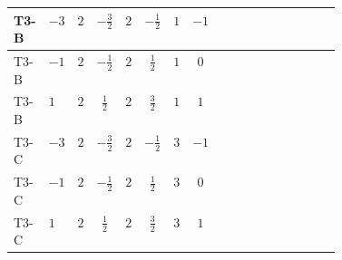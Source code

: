\documentclass[8pt]{article}
\begin{document}
\begin{landscape}
\begin{longtable}{@{}llcccccc >{\raggedright\arraybackslash}p{0.21\linewidth} >{\raggedright\arraybackslash}p{0.21\linewidth}@{}}
\midrule
T3-B & $-3$ & $2$ & $-\frac{3}{2}$ & $2$ & $-\frac{1}{2}$ & $1$ & $-1$ & \scriptsize\adjustbox{max width=\linewidth}{$\begin{gathered} 6 C_{5} Y_d Y_d^\dagger\end{gathered}$} & \scriptsize\adjustbox{max width=\linewidth}{$\begin{gathered} 6 C_{5} Y_u Y_u^\dagger\end{gathered}$} \\
\midrule
T3-B & $-1$ & $2$ & $-\frac{1}{2}$ & $2$ & $\frac{1}{2}$ & $1$ & $0$ & \scriptsize\adjustbox{max width=\linewidth}{$\begin{gathered} 6 C_{5} Y_d Y_d^\dagger\end{gathered}$} & \scriptsize\adjustbox{max width=\linewidth}{$\begin{gathered} 6 C_{5} Y_u Y_u^\dagger\end{gathered}$} \\
\midrule
T3-B & $1$ & $2$ & $\frac{1}{2}$ & $2$ & $\frac{3}{2}$ & $1$ & $1$ & \scriptsize\adjustbox{max width=\linewidth}{$\begin{gathered} 6 C_{5} Y_d Y_d^\dagger\end{gathered}$} & \scriptsize\adjustbox{max width=\linewidth}{$\begin{gathered} 6 C_{5} Y_u Y_u^\dagger\end{gathered}$} \\
\midrule
T3-C & $-3$ & $2$ & $-\frac{3}{2}$ & $2$ & $-\frac{1}{2}$ & $3$ & $-1$ & \scriptsize\adjustbox{max width=\linewidth}{$\begin{gathered} 6 C_{5} Y_d Y_d^\dagger\end{gathered}$} & \scriptsize\adjustbox{max width=\linewidth}{$\begin{gathered} 6 C_{5} Y_u Y_u^\dagger\end{gathered}$} \\
\midrule
T3-C & $-1$ & $2$ & $-\frac{1}{2}$ & $2$ & $\frac{1}{2}$ & $3$ & $0$ & \scriptsize\adjustbox{max width=\linewidth}{$\begin{gathered} 6 C_{5} Y_d Y_d^\dagger\end{gathered}$} & \scriptsize\adjustbox{max width=\linewidth}{$\begin{gathered} 6 C_{5} Y_u Y_u^\dagger\end{gathered}$} \\
\midrule
T3-C & $1$ & $2$ & $\frac{1}{2}$ & $2$ & $\frac{3}{2}$ & $3$ & $1$ & \scriptsize\adjustbox{max width=\linewidth}{$\begin{gathered} 6 C_{5} Y_d Y_d^\dagger\end{gathered}$} & \scriptsize\adjustbox{max width=\linewidth}{$\begin{gathered} 6 C_{5} Y_u Y_u^\dagger\end{gathered}$} \\

\end{longtable}
\end{landscape}
\end{document}
